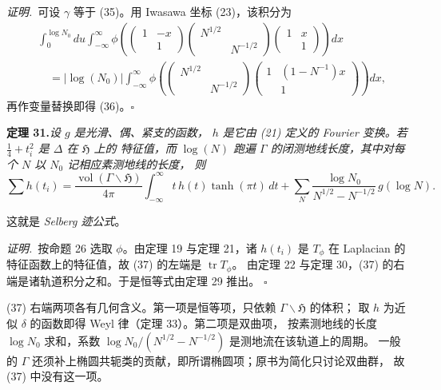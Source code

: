 \smallskip
\noindent\emph{证明.}\ 可设 $\gamma$ 等于 (35)。用 Iwasawa 坐标 (23)，该积分为
\[
\begin{aligned}
&\int_{0}^{\log N_{0}}du\int_{-\infty}^{\infty}
\phi\left(\begin{pmatrix}1&-x\\&1\end{pmatrix}
\begin{pmatrix}N^{1/2}&\\&N^{-1/2}\end{pmatrix}
\begin{pmatrix}1&x\\&1\end{pmatrix}\right)dx\\
&\quad=|\log(N_{0})|\int_{-\infty}^{\infty}
\phi\left(\begin{pmatrix}N^{1/2}&\\&N^{-1/2}\end{pmatrix}
\begin{pmatrix}1&(1-N^{-1})x\\&1\end{pmatrix}\right)dx,
\end{aligned}
\]
再作变量替换即得 (36)。\hfill$\square$

\par\medskip\noindent\textbf{定理 31.}\quad\emph{设 $g$ 是光滑、偶、紧支的函数，
$h$ 是它由 (21) 定义的 Fourier 变换。若 $\tfrac14+t_{i}^{2}$ 是 $\Delta$ 在 $\mathfrak{H}$ 上的
特征值，而 $\log(N)$ 跑遍 $\Gamma$ 的闭测地线长度，其中对每个 $N$ 以 $N_{0}$ 记相应素测地线的长度，
则}
\begin{equation}\tag{37}
\sum h(t_{i})=\frac{\operatorname{vol}(\Gamma\backslash\mathfrak{H})}{4\pi}
\int_{-\infty}^{\infty}t\,h(t)\tanh(\pi t)\,dt
+\sum_{N}\frac{\log N_{0}}{N^{1/2}-N^{-1/2}}\,g(\log N).
\end{equation}

\smallskip
这就是 \emph{Selberg 迹公式}。

\smallskip
\noindent\emph{证明.}\ 按命题 26 选取 $\phi$。由定理 19 与定理 21，诸 $h(t_{i})$ 是
$T_{\phi}$ 在 Laplacian 的特征函数上的特征值，故 (37) 的左端是 $\operatorname{tr}T_{\phi}$。
由定理 22 与定理 30，(37) 的右端是诸轨道积分之和。于是恒等式由定理 29 推出。
\hfill$\square$

\begin{annote}
(37) 右端两项各有几何含义。第一项是恒等项，只依赖 $\Gamma\backslash\mathfrak{H}$ 的体积；
取 $h$ 为近似 $\delta$ 的函数即得 Weyl 律（定理 33）。第二项是双曲项，
按素测地线的长度 $\log N_{0}$ 求和，系数 $\log N_{0}/(N^{1/2}-N^{-1/2})$ 是测地流在该轨道上的周期。
一般的 $\Gamma$ 还须补上椭圆共轭类的贡献，即所谓椭圆项；原书为简化只讨论双曲群，
故 (37) 中没有这一项。
\par\vspace{0.15em}{\raggedleft 【来源：Hejhal, Vol.~1, Springer LNM 548, 1976, Introduction；Iwaniec, 1995, Ch.~10（A）】\par}
\end{annote}

